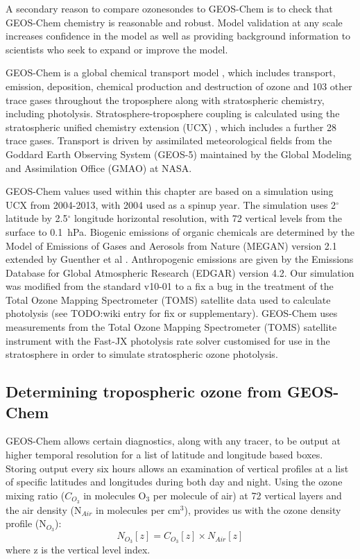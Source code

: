     A secondary reason to compare ozonesondes to GEOS-Chem is to check that GEOS-Chem chemistry is reasonable and robust. 
    Model validation at any scale increases confidence in the model as well as providing background information to scientists who seek to expand or improve the model.

    GEOS-Chem is a global chemical transport model \citep{Bey2001}, which includes transport, emission, deposition, chemical production and destruction of ozone and 103 other trace gases throughout the troposphere along with stratospheric chemistry, including photolysis. 
    Stratosphere-troposphere coupling is calculated using the stratospheric unified chemistry extension (UCX) \citep{Eastham2014}, which includes a further 28 trace gases.
    Transport is driven by assimilated meteorological fields from the Goddard Earth Observing System (GEOS-5) maintained by the Global Modeling and Assimilation Office (GMAO) at NASA.
  
    GEOS-Chem values used within this chapter are based on a simulation using UCX from 2004-2013, with 2004 used as a spinup year.
    The simulation uses 2$^{\circ}$ latitude by 2.5$^{\circ}$ longitude horizontal resolution, with 72 vertical levels from the surface to 0.1~hPa.
    Biogenic emissions of organic chemicals are determined by the Model of Emissions of Gases and Aerosols from Nature (MEGAN) version 2.1 extended by Guenther et al \citep{Guenther2012}.
    Anthropogenic emissions are given by the Emissions Database for Global Atmospheric Research (EDGAR) version 4.2.
    Our simulation was modified from the standard v10-01 to a fix a bug in the treatment of the Total Ozone Mapping Spectrometer (TOMS) satellite data used to calculate photolysis (see TODO:wiki entry for fix or supplementary).
    GEOS-Chem uses measurements from the Total Ozone Mapping Spectrometer (TOMS) satellite instrument with the Fast-JX photolysis rate solver customised for use in the stratosphere in order to simulate stratospheric ozone photolysis.
    
  \subsection{Determining tropospheric ozone from GEOS-Chem}
    GEOS-Chem allows certain diagnostics, along with any tracer, to be output at higher temporal resolution for a list of latitude and longitude based boxes.
    Storing output every six hours allows an examination of vertical profiles at a list of specific latitudes and longitudes during both day and night.
    Using the ozone mixing ratio ($C_{O_3}$ in molecules O$_3$ per molecule of air) at 72 vertical layers and the air density (N$_{Air}$ in molecules per cm$^3$), provides us with the ozone density profile (N$_{O_3}$):
    \begin{equation*}
     N_{O_3}[z] = C_{O_3}[z] \times N_{Air}[z]
    \end{equation*}
    where z is the vertical level index.
    

